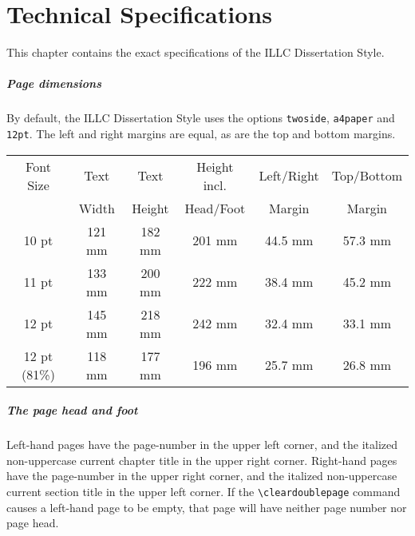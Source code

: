 
\chapter{Technical Specifications}
This chapter contains the exact specifications of the ILLC Dissertation Style.

\paragraph*{Page dimensions}
By default, the ILLC Dissertation Style uses the options
\verb|twoside|, \verb|a4paper| and \verb|12pt|.
The left and right margins are equal, as are the top and bottom margins.
\\[\baselineskip]
\begin{tabular}{|c|c|c|c|c|c|}\hline
Font Size &  Text   &  Text   & Height incl.& Left/Right & Top/Bottom \\
          &  Width  &  Height &  Head/Foot  &   Margin   & Margin     \\ \hline
 10 pt    &  121 mm &  182 mm &  201 mm     &  44.5 mm   &  57.3 mm   \\
 11 pt    &  133 mm &  200 mm &  222 mm     &  38.4 mm   &  45.2 mm   \\
 12 pt    &  145 mm &  218 mm &  242 mm     &  32.4 mm   &  33.1 mm   \\
12 pt (81\%)& 118 mm & 177 mm &  196 mm     &  25.7 mm   &  26.8 mm   \\ \hline
\end{tabular}

\paragraph*{The page head and foot}
Left-hand pages have the page-number in the upper left corner,
and the italized non-uppercase current chapter title in the upper right corner.
Right-hand pages have the page-number in the upper right corner,
and the italized non-uppercase current section title in the upper left corner.
If the \verb|\cleardoublepage| command causes a left-hand page to be empty,
that page will have neither page number nor page head.

